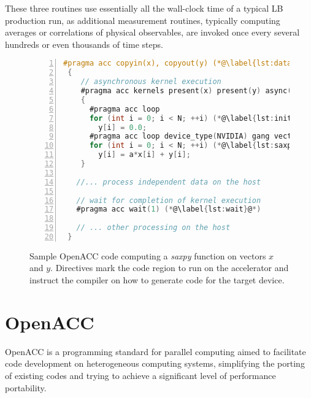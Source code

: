 \documentclass[times]{cpeauth}
\begin{document}
These three routines use essentially all the wall-clock time of a typical 
LB production run, as additional measurement routines, typically computing
averages or correlations of physical observables, are invoked once 
every several hundreds or even thousands of time steps. 

%
\begin{figure}
\centering
{}
\begin{lstlisting}[basicstyle=\footnotesize,language=C,numbers=left,
numberstyle=\color{mygray},stepnumber=1,numbersep=-3.75pt]
 #pragma acc copyin(x), copyout(y) (*@\label{lst:data}@*)
 {
    // asynchronous kernel execution 
    #pragma acc kernels present(x) present(y) async(1) (*@\label{lst:kernels}@*)
    {
      #pragma acc loop 
      for (int i = 0; i < N; ++i) (*@\label{lst:init-loop}@*)
        y[i] = 0.0;
      #pragma acc loop device_type(NVIDIA) gang vector(256) (*@\label{lst:gang-vector}@*)
      for (int i = 0; i < N; ++i) (*@\label{lst:saxpy-loop}@*)
        y[i] = a*x[i] + y[i];
    }
   
   //... process independent data on the host
   
   // wait for completion of kernel execution
   #pragma acc wait(1) (*@\label{lst:wait}@*)
   
   // ... other processing on the host
 }
\end{lstlisting}
\caption{\label{lst:saxpy} Sample OpenACC code computing a {\em saxpy}
function on vectors $x$ and $y$. Directives mark the 
code region to run on the accelerator and instruct the compiler on how to 
generate code for the target device.}
\end{figure}
%

\section{OpenACC}\label{sec:openacc}

OpenACC is a programming standard for parallel computing aimed to 
facilitate code development on heterogeneous computing systems,
simplifying the porting of existing codes and trying to achieve a 
significant level of performance portability.
%
\end{document}
